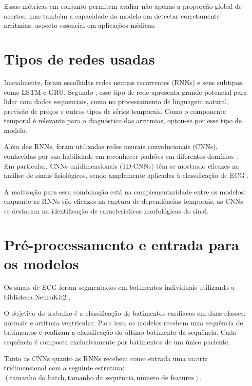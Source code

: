\documentclass[
    12pt,                %
    openright,           %
    oneside,             %
    a4paper,             %
    brazil               %
]{abntex2}
\begin{document}
Essas métricas em conjunto permitem avaliar não apenas a proporção global de acertos, mas também a capacidade do modelo em detectar corretamente arritmias, aspecto essencial em aplicações médicas.

\section{Tipos de redes usadas}
\label{sec:tipo_redes}

Inicialmente, foram escolhidas redes neurais recorrentes (RNNs) e seus subtipos, como LSTM e GRU. Segundo , esse tipo de rede apresenta grande potencial para lidar com dados sequenciais, como no processamento de linguagem natural, previsão de preços e outros tipos de séries temporais. Como o componente temporal é relevante para o diagnóstico das arritmias, optou-se por esse tipo de modelo.

Além das RNNs, foram utilizadas redes neurais convolucionais (CNNs), conhecidas por sua habilidade em reconhecer padrões em diferentes domínios . Em particular, CNNs unidimensionais (1D-CNNs) têm se mostrado eficazes na análise de sinais fisiológicos, sendo amplamente aplicadas à classificação de ECG \cite{narotamo2024}.

A motivação para essa combinação está na complementaridade entre os modelos: enquanto as RNNs são eficazes na captura de dependências temporais, as CNNs se destacam na identificação de características morfológicas do sinal.

\section{Pré-processamento e entrada para os modelos}
\label{sec:pre_process}

Os sinais de ECG foram segmentados em batimentos individuais utilizando a biblioteca NeuroKit2 \cite{makowski2021neurokit}. 

O objetivo do trabalho é a classificação de batimentos cardíacos em duas classes: normais e arritmia ventricular. Para isso, os modelos recebem uma sequência de batimentos e realizam a classificação do último batimento da sequência. Cada sequência é composta exclusivamente por batimentos de um único paciente.

Tanto as CNNs quanto as RNNs recebem como entrada uma matriz tridimensional com a seguinte estrutura: $(\text{tamanho do batch}, \text{tamanho da sequência}, \text{número de features})$.
\end{document}
